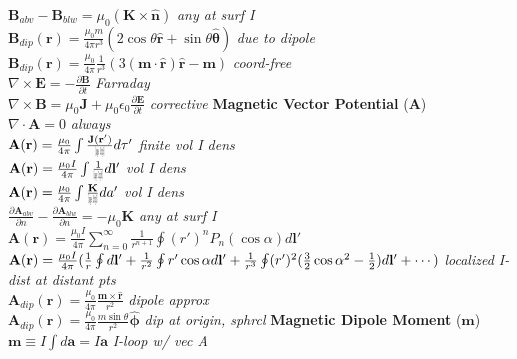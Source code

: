 \documentclass[9pt]{extarticle}
\def\rcurs{{\mbox{$\resizebox{.09in}{.08in}{\texttt{[image: ScriptR]}}$}}}
\begin{document}
\begin{multicols}{3}
$\mathbf{B}_{abv} - \mathbf{B}_{blw} = \mu_{0}(\mathbf{K}\times\mathbf{\hat{n}})$ \textit{any at surf I} \\
$\mathbf{B}_{dip}(\mathbf{r}) = \frac{\mu_{0}m}{4\pi r^{3}}(2\cos{\theta}\mathbf{\hat{r}} + \sin{\theta}\mathbf{\hat{\theta}})$ \textit{due to dipole} \\
$\mathbf{B}_{dip}(\mathbf{r}) = \frac{\mu_{0}}{4\pi}\frac{1}{r^{3}}(3(\mathbf{m}\cdot\mathbf{\hat{r}})\mathbf{\hat{r}}-\mathbf{m})$ \textit{coord-free} \\
$\nabla\times\mathbf{E} = -\frac{\partial\mathbf{B}}{\partial t}$ \textit{Farraday} \\
$\nabla\times\mathbf{B}=\mu_{0}\mathbf{J}+\mu_{0}\epsilon_{0}\frac{\partial\mathbf{E}}{\partial t}$ \textit{corrective}
\textbf{Magnetic Vector Potential} ($\mathbf{A}$) \\
$\nabla\cdot\mathbf{A} = 0$ \textit{always} \\
$\mathbf{A}(\mathbf{r}) = \frac{\mu_{0}}{4\pi}\int\frac{\mathbf{J}(\mathbf{r}')}{\rcurs}d\tau '$ \textit{finite vol I dens} \\
$\mathbf{A}(\mathbf{r}) = \frac{\mu_{0}I}{4\pi}\int\frac{1}{\rcurs}d\mathbf{l}'$ \textit{vol I dens} \\
$\mathbf{A}(\mathbf{r}) = \frac{\mu_{0}}{4\pi}\int\frac{\mathbf{K}}{\rcurs}da '$ \textit{vol I dens} \\
$\frac{\partial\mathbf{A}_{abv}}{\partial n} - \frac{\partial\mathbf{A}_{blw}}{\partial n} = -\mu_{0}\mathbf{K}$ \textit{any at surf I} \\
$\mathbf{A}(\mathbf{r}) = \frac{\mu_{0}I}{4\pi}\sum_{n=0}^{\infty}\frac{1}{r^{n+1}}\oint(r')^{n}P_{n}(\cos{\alpha})d\mathbf{l}'$  \\
$\mathbf{A}(\mathbf{r}) = \frac{\mu_{0}I}{4\pi}(\frac{1}{r}\oint d\mathbf{l}' + \frac{1}{r^{2}} \oint r'\cos{\alpha}d\mathbf{l}' \\ + \frac{1}{r^{3}}\oint (r')^{2}(\frac{3}{2}\cos{\alpha}^{2}-\frac{1}{2})d\mathbf{l}' + \cdots)$ \textit{localized I-dist at distant pts} \\
$\mathbf{A}_{dip}(\mathbf{r}) = \frac{\mu_{0}}{4\pi}\frac{\mathbf{m}\times\mathbf{\hat{r}}}{r^{2}}$ \textit{dipole approx} \\
$\mathbf{A}_{dip}(\mathbf{r}) = \frac{\mu_{0}}{4\pi}\frac{m\sin{\theta}}{r^{2}}\mathbf{\hat{\phi}}$ \textit{dip at origin, sphrcl}
\textbf{Magnetic Dipole Moment} ($\mathbf{m}$) \\
$\mathbf{m} \equiv I\int d\mathbf{a} = I\mathbf{a}$ \textit{I-loop w/ vec A} \\

\end{multicols}
\end{document}

